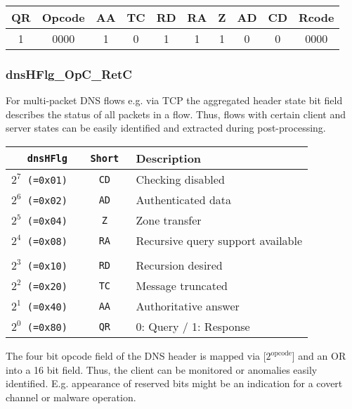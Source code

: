 \documentclass[documentation]{subfiles}
\begin{document}
\begin{longtable}{cccccccccc}
    \toprule
    {\bf QR} & {\bf Opcode} & {\bf AA} & {\bf TC} & {\bf RD} & {\bf RA} & {\bf Z} & {\bf AD} & {\bf CD} & {\bf Rcode} \\
    \midrule\endhead%
    1        & 0000         & 1        & 0        & 1        & 1        & 1       & 0        & 0        & 0000 \\
    \bottomrule
\end{longtable}

\subsubsection{dnsHFlg\_OpC\_RetC}\label{dnsHFlgOpCRetC}
For multi-packet DNS flows e.g. via TCP the aggregated header state bit field describes
the status of all packets in a flow. Thus, flows with certain client and server states can
be easily identified and extracted during post-processing.

\begin{longtable}{>{\tt}r>{\tt}cl}
    \toprule
    {\bf dnsHFlg} & {\bf Short} & {\bf Description}\\
    \midrule\endhead%
    $2^7$ (=0x01) & CD          & Checking disabled \\
    $2^6$ (=0x02) & AD          & Authenticated data \\
    $2^5$ (=0x04) & Z           & Zone transfer \\
    $2^4$ (=0x08) & RA          & Recursive query support available \\
    \\
    $2^3$ (=0x10) & RD          & Recursion desired \\
    $2^2$ (=0x20) & TC          & Message truncated \\
    $2^1$ (=0x40) & AA          & Authoritative answer\\
    $2^0$ (=0x80) & QR          & 0: Query / 1: Response \\
    \bottomrule
\end{longtable}

The four bit opcode field of the DNS header is mapped via [$2^{\text{opcode}}$] and an OR
into a 16 bit field. Thus, the client can be monitored or anomalies easily identified.
E.g. appearance of reserved bits might be an indication for a covert channel or
malware operation.
\end{document}
